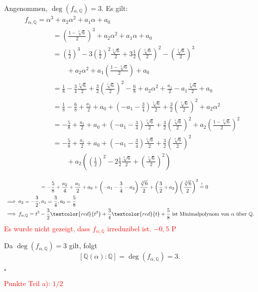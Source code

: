 \documentclass[12pt]{article}
\newcommand{\corr}[1]{\textcolor{red}{#1}}
\newcommand{\QED}{\begin{flushright} $\square$ \end{flushright}}
\newcommand{\df}{\enspace\Longrightarrow\enspace}
\newcommand{\grad}{\operatorname{deg}}
\begin{document}
\begin{enumerate}
	Angenommen, $\grad(f_{\alpha,\mathbb{Q}})=3$. Es gilt:
	\begin{align*}
		&f_{\alpha,\mathbb{Q}}=\alpha^3+a_2\alpha^2+a_1\alpha+a_0 \\
		&\quad\quad\quad\quad=\left(\frac{1-\sqrt[3]{6}}{2}\right)^3+a_2\alpha^2+a_1\alpha+a_0 \\
		&\quad\quad\quad\quad=\left(\frac{1}{2}\right)^3-3\left(\frac{1}{2}\right)^2\frac{\sqrt[3]{6}}{2}+3\frac{1}{2}\left(\frac{\sqrt[3]{6}}{2}\right)^2-\left(\frac{\sqrt[3]{6}}{2}\right)^3 \\
		&\quad\quad\quad\quad\quad\quad+a_2\alpha^2+a_1\left(\frac{1-\sqrt[3]{6}}{2}\right)+a_0 \\
		&\quad\quad\quad\quad=\frac{1}{8}-\frac{3}{4}\frac{\sqrt[3]{6}}{2}+\frac{3}{2}\left(\frac{\sqrt[3]{6}}{2}\right)^2-\frac{6}{8}+a_2\alpha^2+\frac{a_1}{2}-a_1\frac{\sqrt[3]{6}}{2}+a_0 \\
		&\quad\quad\quad\quad=\frac{1}{8}-\frac{6}{8}+\frac{a_1}{2}+a_0+\left(-a_1-\frac{3}{4}\right)\frac{\sqrt[3]{6}}{2}+\frac{3}{2}\left(\frac{\sqrt[3]{6}}{2}\right)^2+a_2\alpha^2 \\
		&\quad\quad\quad\quad=-\frac{5}{8}+\frac{a_1}{2}+a_0+\left(-a_1-\frac{3}{4}\right)\frac{\sqrt[3]{6}}{2}+\frac{3}{2}\left(\frac{\sqrt[3]{6}}{2}\right)^2+a_2\left(\frac{1-\sqrt[3]{6}}{2}\right)^2 \\
		&\quad\quad\quad\quad=-\frac{5}{8}+\frac{a_1}{2}+a_0+\left(-a_1-\frac{3}{4}\right)\frac{\sqrt[3]{6}}{2}+\frac{3}{2}\left(\frac{\sqrt[3]{6}}{2}\right)^2 \\
		&\quad\quad\quad\quad\quad\quad+a_2\left(\left(\frac{1}{2}\right)^2-2\frac{1}{2}\frac{\sqrt[3]{6}}{2}+\left(\frac{\sqrt[3]{6}}{2}\right)^2\right) \\
	\end{align*}
	\begin{align*}		
		&\quad\quad\quad\quad=-\frac{5}{8}+\frac{a_2}{4}+\frac{a_1}{2}+a_0+\left(-a_1-\frac{3}{4}-a_2\right)\frac{\sqrt[3]{6}}{2}+\left(\frac{3}{2}+a_2\right)\left(\frac{\sqrt[3]{6}}{2}\right)^2\overset{!}{=}0 \\
		\df&a_2=-\frac{3}{2},a_1=\frac{3}{4},a_0=\frac{5}{8} \\
		\df&f_{\alpha,\mathbb{Q}}=t^3-\frac{3}{2}\corr{t^2}+\frac{3}{4}\corr{t}+\frac{5}{8}\text{ ist Minimalpolynom von $\alpha$ über $\mathbb{Q}$}.
	\end{align*}
\corr{Es wurde nicht gezeigt, dass $f_{\alpha,\mathbb{Q}}$ irreduzibel ist.  $-0,5$ P}
	
	Da $\grad(f_{\alpha,\mathbb{Q}})=3$ gilt, folgt $$\left[\mathbb{Q}(\alpha):\mathbb{Q}\right]=\grad(f_{\alpha,\mathbb{Q}})=3.$$
	\QED
\corr{Punkte Teil a): $1/2$}	


\end{enumerate}
\end{document}
